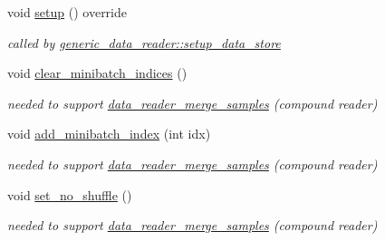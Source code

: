 \begin{DoxyCompactItemize}
\item 
void \hyperlink{classlbann_1_1data__store__pilot2__molecular_a975d7907053a8b2e92ea5f77ca4ae7a3}{setup} () override
\begin{DoxyCompactList}\small\item\em called by \hyperlink{classlbann_1_1generic__data__reader_a8b2a09d38512fc11f1b9d572c89100a7}{generic\+\_\+data\+\_\+reader\+::setup\+\_\+data\+\_\+store} \end{DoxyCompactList}\item 
void \hyperlink{classlbann_1_1data__store__pilot2__molecular_a246274b369ed60bf214cf503019ab2ca}{clear\+\_\+minibatch\+\_\+indices} ()
\begin{DoxyCompactList}\small\item\em needed to support \hyperlink{classlbann_1_1data__reader__merge__samples}{data\+\_\+reader\+\_\+merge\+\_\+samples} (compound reader) \end{DoxyCompactList}\item 
void \hyperlink{classlbann_1_1data__store__pilot2__molecular_ae8d35b2245ee84a7e9b3653802e472ca}{add\+\_\+minibatch\+\_\+index} (int idx)
\begin{DoxyCompactList}\small\item\em needed to support \hyperlink{classlbann_1_1data__reader__merge__samples}{data\+\_\+reader\+\_\+merge\+\_\+samples} (compound reader) \end{DoxyCompactList}\item 
void \hyperlink{classlbann_1_1data__store__pilot2__molecular_a6abbcb3996da1fd6ef165463ad27debe}{set\+\_\+no\+\_\+shuffle} ()
\begin{DoxyCompactList}\small\item\em needed to support \hyperlink{classlbann_1_1data__reader__merge__samples}{data\+\_\+reader\+\_\+merge\+\_\+samples} (compound reader) \end{DoxyCompactList}\end{DoxyCompactItemize}
